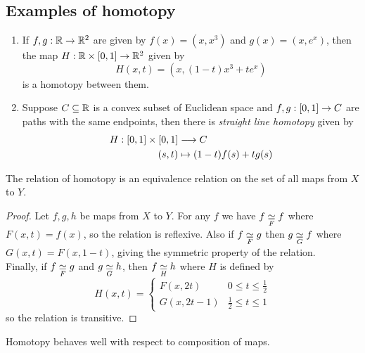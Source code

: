 \subsection*{Examples of homotopy}
\begin{enumerate}
    \item If $f,g : \mathbb{R} \rightarrow \mathbb{R}^2$ are given by $f(x) = (x, x^3)$ and $g(x) = (x, e^x)$, then the map $H : \mathbb{R} \times [0,1] \rightarrow \mathbb{R}^2$ given by
          \[
              H (x,t) = \left(x, (1-t)x^3 + te^x\right)
          \]
          is a homotopy between them.
    \item Suppose $C \subseteq \mathbb{R}$ is a convex subset of Euclidean space and $f,g : [0,1] \rightarrow C$ are paths with the same endpoints, then there is \textit{straight line homotopy} given by
          \begin{align*}
              H : [0,1] \times [0,1] & \longrightarrow C                     \\
              (s,t)                  & \mapsto (1-t) f(s) + tg(s)
          \end{align*}


\end{enumerate}

\begin{lem}
    The relation of homotopy is an equivalence relation on the set of all maps from $X$ to $Y$.
\end{lem}
\begin{proof}
    Let $f,g,h$ be maps from $X$ to $Y$.
    For any $f$ we have $f \underset{F}{\simeq} f$ where $F(x,t) = f(x)$, so the relation is reflexive.
    Also if $f \underset{F}{\simeq} g$ then $g \underset{G}{\simeq} f$ where $G(x,t) = F(x, 1-t)$, giving the symmetric property of the relation.
    \\
    Finally, if $f \underset{F}{\simeq} g$ and $g \underset{G}{\simeq} h$, then $f \underset{H}{\simeq} h$ where $H$ is defined by
    \begin{equation*}
        H(x,t) = \begin{cases}
            F(x, 2t)     & 0 \le t \le \frac12 \\
            G(x, 2t - 1) & \frac12 \le t \le 1
        \end{cases}
    \end{equation*}
    so the relation is transitive.
\end{proof}

\begin{lem}\label{lem:hom-top-comp}
    Homotopy behaves well with respect to composition of maps.
\end{lem}

